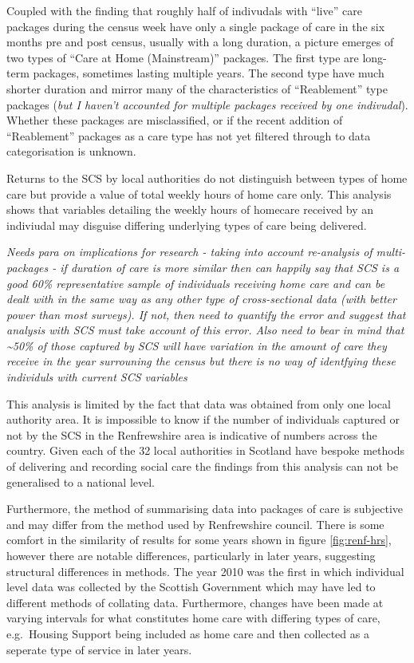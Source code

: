 \documentclass[]{article}
\begin{document}
Coupled with the finding that roughly half of indivudals with ``live''
care packages during the census week have only a single package of care
in the six months pre and post census, usually with a long duration, a
picture emerges of two types of ``Care at Home (Mainstream)'' packages.
The first type are long-term packages, sometimes lasting multiple years.
The second type have much shorter duration and mirror many of the
characteristics of ``Reablement'' type packages (\emph{but I haven't
accounted for multiple packages received by one indivudal}). Whether
these packages are misclassified, or if the recent addition of
``Reablement'' packages as a care type has not yet filtered through to
data categorisation is unknown.

Returns to the SCS by local authorities do not distinguish between types
of home care but provide a value of total weekly hours of home care
only. This analysis shows that variables detailing the weekly hours of
homecare received by an indiviudal may disguise differing underlying
types of care being delivered.

\emph{Needs para on implications for research - taking into account
re-analysis of multi-packages - if duration of care is more similar then
can happily say that SCS is a good 60\% representative sample of
individuals receiving home care and can be dealt with in the same way as
any other type of cross-sectional data (with better power than most
surveys). If not, then need to quantify the error and suggest that
analysis with SCS must take account of this error. Also need to bear in
mind that \textasciitilde{}50\% of those captured by SCS will have
variation in the amount of care they receive in the year surrouning the
census but there is no way of identfying these individuls with current
SCS variables}

This analysis is limited by the fact that data was obtained from only
one local authority area. It is impossible to know if the number of
individuals captured or not by the SCS in the Renfrewshire area is
indicative of numbers across the country. Given each of the 32 local
authorities in Scotland have bespoke methods of delivering and recording
social care the findings from this analysis can not be generalised to a
national level.

Furthermore, the method of summarising data into packages of care is
subjective and may differ from the method used by Renfrewshire council.
There is some comfort in the similarity of results for some years shown
in figure \ref{fig:renf-hrs}, however there are notable differences,
particularly in later years, suggesting structural differences in
methods. The year 2010 was the first in which individual level data was
collected by the Scottish Government which may have led to different
methods of collating data. Furthermore, changes have been made at
varying intervals for what constitutes home care with differing types of
care, e.g.~Housing Support being included as home care and then
collected as a seperate type of service in later years.
\end{document}
